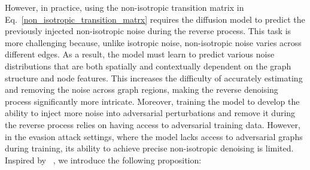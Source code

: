 However, in practice, using the non-isotropic transition matrix in Eq.~\eqref{non_isotropic_transition_matrx}   requires the diffusion model to predict the previously injected non-isotropic noise during the reverse process. This task is more challenging because, unlike isotropic noise, non-isotropic noise varies across different edges. As a result, the model must learn to predict various noise distributions that are both spatially and contextually dependent on the graph structure and node features. This increases the difficulty of accurately estimating and removing the noise across graph regions, making the reverse denoising process significantly more intricate. 
Moreover, training the model to develop the ability to inject more noise into adversarial perturbations and remove it during the reverse process relies on having access to adversarial training data.
However, in the evasion attack settings, where the model lacks access to adversarial graphs during training, its ability to achieve precise non-isotropic denoising is limited.
Inspired by ~\cite{yu2024constructing}, we introduce the following proposition:

